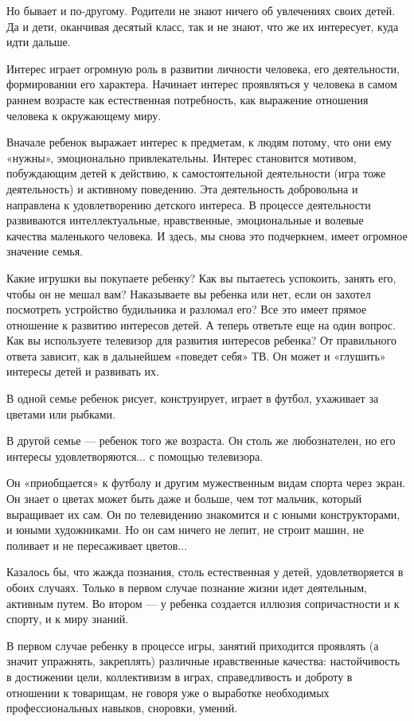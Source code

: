 \documentclass[12pt, a4paper, openany]{book}
\begin{document}
Но бывает и по-другому. Родители не знают ничего об увлечениях своих детей. Да и дети, оканчивая десятый класс, так и не знают, что же их интересует, куда идти дальше. 

Интерес играет огромную роль в развитии личности человека, его деятельности, формировании его характера. Начинает интерес проявляться у человека в самом раннем возрасте как естественная потребность, как выражение отношения человека к окружающему миру. 

Вначале ребенок выражает интерес к предметам, к людям потому, что они ему «нужны», эмоционально привлекательны. Интерес становится мотивом, побуждающим детей к действию, к самостоятельной деятельности (игра тоже деятельность) и активному поведению. Эта деятельность добровольна и направлена к удовлетворению детского интереса. В процессе деятельности развиваются интеллектуальные, нравственные, эмоциональные и волевые качества маленького человека. И здесь, мы снова это подчеркнем, имеет огромное значение семья. 

Какие игрушки вы покупаете ребенку? Как вы пытаетесь успокоить, занять его, чтобы он не мешал вам? Наказываете вы ребенка или нет, если он захотел посмотреть устройство будильника и разломал его? Все это имеет прямое отношение к развитию интересов детей. А теперь ответьте еще на один вопрос. Как вы используете телевизор для развития интересов ребенка? От правильного ответа зависит, как в дальнейшем «поведет себя» ТВ. Он может и «глушить» интересы детей и развивать их. 

В одной семье ребенок рисует, конструирует, играет в футбол, ухаживает за цветами или рыбками.

В другой семье — ребенок того же возраста. Он столь же любознателен, но его интересы удовлетворяются... с помощью телевизора. 

Он «приобщается» к футболу и другим мужественным видам спорта через экран. Он знает о цветах может быть даже и больше, чем тот мальчик, который выращивает их сам. Он по телевидению знакомится и с юными конструкторами, и юными художниками. Но он сам ничего не лепит, не строит машин, не поливает и не пересаживает цветов... 

Казалось бы, что жажда познания, столь естественная у детей, удовлетворяется в обоих случаях. Только в первом случае познание жизни идет деятельным, активным путем. Во втором — у ребенка создается иллюзия сопричастности и к спорту, и к миру знаний. 

В первом случае ребенку в процессе игры, занятий приходится проявлять (а значит упражнять, закреплять) различные нравственные качества: настойчивость в достижении цели, коллективизм в играх, справедливость и доброту в отношении к товарищам, не говоря уже о выработке необходимых профессиональных навыков, сноровки, умений. 
\end{document}
